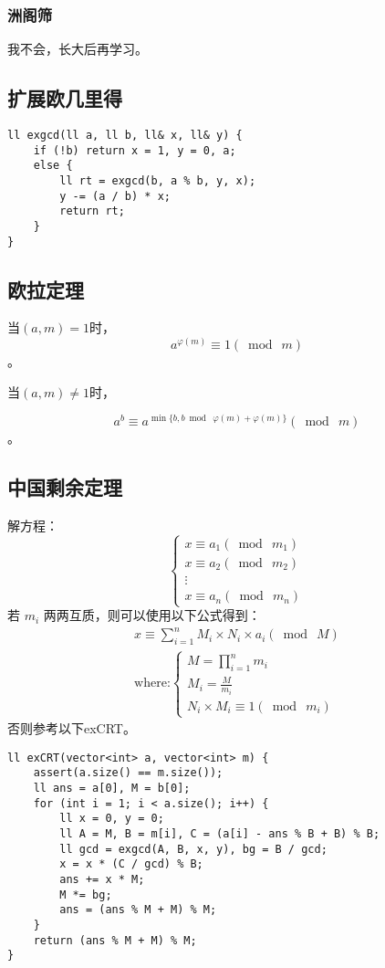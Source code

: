 \documentclass[twoside]{article}
\begin{document}
\subsubsection{洲阁筛}
我不会，长大后再学习。\subsection{扩展欧几里得}
\begin{lstlisting}
ll exgcd(ll a, ll b, ll& x, ll& y) {
	if (!b) return x = 1, y = 0, a;
	else {
		ll rt = exgcd(b, a % b, y, x);
		y -= (a / b) * x;
		return rt;
	}
}\end{lstlisting}
\subsection{欧拉定理}
当$(a,m)=1$时，
$$a^{\varphi(m)}\equiv 1(\bmod\ m)$$。

当$(a,m)\neq 1$时，

$$a^b\equiv a^{\min\{b, b \bmod\ \varphi(m)+\varphi(m)\}}(\bmod\ m)$$。\subsection{中国剩余定理}
解方程：
\[
    \begin{cases}
        x\equiv a_1(\bmod\ m_1)\\
        x\equiv a_2(\bmod\ m_2)\\
        \vdots\\
        x\equiv a_n(\bmod\ m_n)
    \end{cases}
\]
若 $m_i$ 两两互质，则可以使用以下公式得到：
\[
\begin{aligned}
    x \equiv \sum_{i=1}^n M_i \times N_i \times a_i (\bmod\ M)\\
    \text{where:}
    \begin{cases}
        M = \prod_{i=1}^n m_i \\
        M_i = \frac{M}{m_i}\\
        N_i \times M_i \equiv 1 (\bmod\ m_i)
    \end{cases}
\end{aligned}
\]
否则参考以下exCRT。
\begin{lstlisting}
ll exCRT(vector<int> a, vector<int> m) {
	assert(a.size() == m.size());
	ll ans = a[0], M = b[0];
	for (int i = 1; i < a.size(); i++) {
		ll x = 0, y = 0;
		ll A = M, B = m[i], C = (a[i] - ans % B + B) % B;
		ll gcd = exgcd(A, B, x, y), bg = B / gcd;
		x = x * (C / gcd) % B;
		ans += x * M;
		M *= bg;
		ans = (ans % M + M) % M;
	}
	return (ans % M + M) % M;
}
\end{lstlisting}
\end{document}
